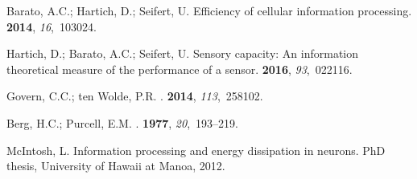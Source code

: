 \documentclass[entropy,article,
submit,
moreauthors,pdftex,10pt,a4paper]{mdpi}
\begin{document}
\begin{thebibliography}{-------}
Barato, A.C.; Hartich, D.; Seifert, U.
\newblock Efficiency of cellular information processing.
 {\bf 2014}, {\em 16},~103024.

Hartich, D.; Barato, A.C.; Seifert, U.
\newblock Sensory capacity: An information theoretical measure of the
  performance of a sensor.
 {\bf 2016}, {\em 93},~022116.

Govern, C.C.; ten Wolde, P.R.
.
 {\bf 2014}, {\em 113},~258102.

Berg, H.C.; Purcell, E.M.
.
 {\bf 1977}, {\em 20},~193--219.

McIntosh, L.
\newblock Information processing and energy dissipation in neurons.
\newblock PhD thesis, University of Hawaii at Manoa,  2012.

\end{thebibliography}
\end{document}
